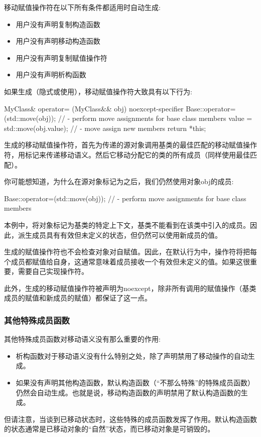 移动赋值操作符在以下所有条件都适用时自动生成:

\begin{itemize}
	\item 用户没有声明复制构造函数
	\item 用户没有声明移动构造函数
	\item 用户没有声明复制赋值操作符
	\item 用户没有声明析构函数
\end{itemize}

如果生成（隐式或使用），移动赋值操作符大致具有以下行为:

\begin{cppcode}
MyClass& operator= (MyClass&& obj) noexcept-specifier {
	Base::operator=(std::move(obj)); // - perform move assignments for base class members
	value = std::move(obj.value); // - move assign new members
	return *this;
}
\end{cppcode}

生成的移动赋值操作符，首先为传递的源对象调用基类的最佳匹配的移动赋值操作符，用标记来传递移动语义。然后它移动分配它的类的所有成员（同样使用最佳匹配）。

你可能想知道，为什么在源对象标记为之后，我们仍然使用对象obj的成员:

\begin{cppcode}
Base::operator=(std::move(obj)); // - perform move assignments for base class members
\end{cppcode}

本例中，将对象标记为基类的特定上下文，基类不能看到在该类中引入的成员。因此，派生成员具有有效但未定义的状态，但仍然可以使用新成员的值。

生成的赋值操作符也不会检查对象对自赋值。因此，在默认行为中，操作符将把每个成员都赋值给自身，这通常意味着成员接收一个有效但未定义的值。如果这很重要，需要自己实现操作符。

此外，生成的移动赋值操作符被声明为noexcept，除非所有调用的赋值操作（基类成员的赋值和新成员的赋值）都保证了这一点。

\subsubsection{其他特殊成员函数}

其他特殊成员函数对移动语义没有那么重要的作用:

\begin{itemize}
	\item 析构函数对于移动语义没有什么特别之处，除了声明禁用了移动操作的自动生成。
	\item 如果没有声明其他构造函数，默认构造函数（“不那么特殊”的特殊成员函数）仍然会自动生成。也就是说，移动构造函数的声明禁用了默认构造函数的生成。
\end{itemize}

但请注意，当谈到已移动状态时，这些特殊的成员函数发挥了作用。默认构造函数的状态通常是已移动对象的“自然”状态，而已移动对象是可销毁的。
















